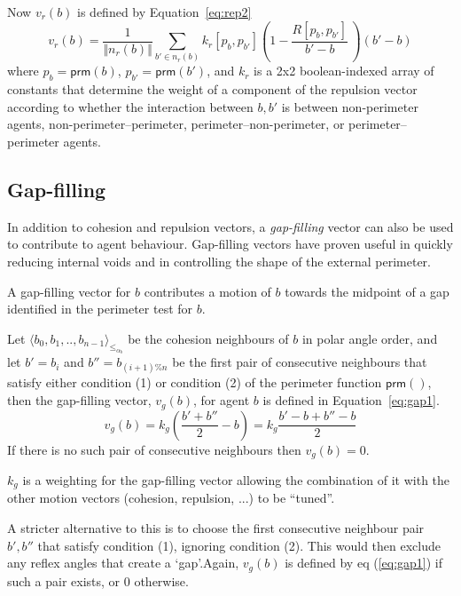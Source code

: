 \documentclass[12pt,a4paper]{IEEEtran}
\newcommand{\magn}[1]{\Vert{#1}\Vert}
\newcommand{\vbb}[2]{#2-#1}
\newcommand{\pangle}{\mathit{\alpha}}
\newcommand{\leqaz}[3]{#2 \leq_{\pangle_#1} #3}
\newcommand{\angleordered}[2]{\langle #2 \rangle_{\leqaz{#1}{}{}}}
\newcommand{\prm}{\mathsf{prm}}
\newcommand{\kr}{\mathit{k_r}}
\newcommand{\kg}{\mathit{k_g}}
\newcommand{\rb}{\mathit{R}}
\begin{document}
Now $v_r(b)$ is defined by Equation~\ref{eq:rep2}
\small
\begin{equation}\label{eq:rep2}
	v_r(b) = \frac{1}{\magn{n_r(b)}}\sum_{b' \in n_r(b)} \kr[p_b,p_{b'}] \left(1 - \frac{\rb[p_b,p_{b'}]}{\vbb{b}{b'}} \, \right) (\vbb{b}{b'})
\end{equation}
\normalsize
where $p_b = \prm(b)$, $p_{b'} = \prm(b')$, and $\kr$ is a 2x2 boolean-indexed
array of constants that determine the weight of a component of the repulsion
vector according to whether the interaction between $b,b'$ is between
non-perimeter agents, non-perimeter--perimeter, perimeter--non-perimeter, or
perimeter--perimeter agents.

\subsection{Gap-filling}

In addition to cohesion and repulsion vectors, a \emph{gap-filling} vector can
also be used to contribute to agent behaviour. Gap-filling vectors have proven
useful in quickly reducing internal voids and in controlling the shape of the
external perimeter.

A gap-filling vector for $b$ contributes a motion of $b$ towards the midpoint
of a gap identified in the perimeter test for $b$.

Let $\angleordered{b}{b_0, b_1, .., b_{n-1}}$ be the cohesion neighbours of $b$
in polar angle order, and let $b' = b_i$  and $b'' = b_{(i+1)\%n}$ be the first
pair of consecutive neighbours that satisfy either condition (1) or condition
(2) of the perimeter function $\prm()$, then the gap-filling vector, $v_g(b)$,
for agent $b$ is defined in Equation~\ref{eq:gap1}.
\small
\begin{equation}\label{eq:gap1}
v_g(b) = \kg \left (\frac{b' + b''}{2} - b \right) = \kg \frac{\vbb{b}{b'} + \vbb{b}{b''}}{2} 
\end{equation}
\normalsize
If there is no such pair of consecutive neighbours then $v_g(b) = 0$.

$\kg$ is a weighting for the gap-filling vector allowing the combination of it
with the other motion vectors (cohesion, repulsion, ...) to be ``tuned''.

A stricter alternative to this is to choose the first consecutive neighbour
pair $b',b''$ that satisfy condition (1), ignoring condition (2).  This would then exclude any reflex angles that create a `gap'.Again, $v_g(b)$ is defined by eq (\ref{eq:gap1}) if such a pair exists, or 0 otherwise.
\end{document}
